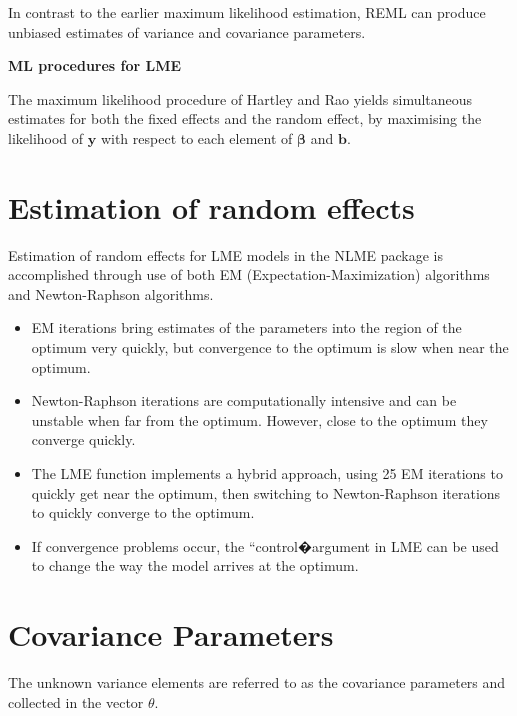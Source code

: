 \documentclass[12pt, a4paper]{report}
\theoremstyle{plain}
\theoremstyle{definition}
\theoremstyle{remark}
\begin{document}
	In contrast to the earlier maximum likelihood estimation, REML can produce unbiased estimates of variance and covariance parameters.
	
	
	\noindent \textbf{ML procedures for LME}
	
	The maximum likelihood procedure of Hartley and Rao yields
	simultaneous estimates for both the fixed effects and the random
	effect, by maximising the likelihood of $\boldsymbol{y}$ with
	respect to each element of $\boldsymbol{\beta}$ and
	$\boldsymbol{b}$.
	
	
	\section{Estimation of random effects}
	
	Estimation of random effects for LME models in the NLME package is accomplished through use
	of both EM (Expectation-Maximization) algorithms and Newton-Raphson algorithms.
	\begin{itemize}
		\item EM iterations bring estimates of the parameters into the region of the optimum very quickly, but
		convergence to the optimum is slow when near the optimum.
		\item Newton-Raphson iterations are computationally intensive and can be unstable when far from the
		optimum. However, close to the optimum they converge quickly.
		\item The LME function implements a hybrid approach, using 25 EM iterations to quickly get near the
		optimum, then switching to Newton-Raphson iterations to quickly converge to the optimum. \item If
		convergence problems occur, the ``control�argument in LME can be used to change the way the
		model arrives at the optimum.
	\end{itemize}
	
	
	
	
	
	\section{Covariance Parameters} %
	The unknown variance elements are referred to as the covariance parameters and collected in the vector $\theta$.
	
\end{document}
